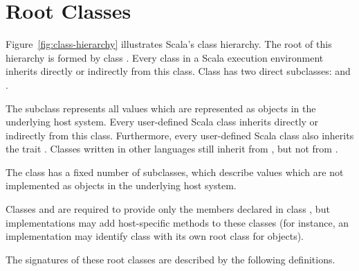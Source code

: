 \section{Root Classes}
\label{sec:cls-root}
\label{sec:cls-any}
\label{sec:cls-object}

Figure~\ref{fig:class-hierarchy} illustrates Scala's class
hierarchy.
The root of this hierarchy is formed by class .
Every class in a Scala execution environment inherits directly or
indirectly from this class.  Class  has two direct
subclasses:  and .

The subclass  represents all values which are represented
as objects in the underlying host system. Every user-defined Scala
class inherits directly or indirectly from this class. Furthermore,
every user-defined Scala class also inherits the trait
.  Classes written in other languages still
inherit from , but not from
.

The class  has a fixed number of subclasses, which describe
values which are not implemented as objects in the underlying host
system.

Classes  and  are required to provide only
the members declared in class , but implementations may add
host-specific methods to these classes (for instance, an
implementation may identify class  with its own root
class for objects).

The signatures of these root classes are described by the following
definitions.

